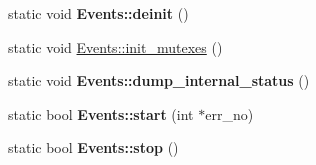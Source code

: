\begin{DoxyCompactItemize}
static void {\bfseries Events\+::deinit} ()
\item 
static void \mbox{\hyperlink{group__Event__Scheduler_gaa26988f7ec7f5d0053af28a5d8586236}{Events\+::init\+\_\+mutexes}} ()
\item 
\mbox{\label{group__Event__Scheduler_ga8ab6bb97c082a9540cb375349db4178f}} 
static void {\bfseries Events\+::dump\+\_\+internal\+\_\+status} ()
\item 
\mbox{\label{group__Event__Scheduler_ga3856f26945354900123795b01d501465}} 
static bool {\bfseries Events\+::start} (int $\ast$err\+\_\+no)
\item 
\mbox{\label{group__Event__Scheduler_gaca23f0c484748291386775e33a4764e3}} 
static bool {\bfseries Events\+::stop} ()
\end{DoxyCompactItemize}
